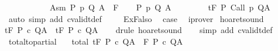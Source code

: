 \begin{isabellebody}
\ \ \ \ \isamarkupfalse%
\isanewline
\ \ \isamarkupfalse%
\isanewline
{}\isamarkupfalse%
\isanewline
\ \ \isamarkupfalse%
\ {\isacharparenleft}Asm\ P\ p\ Q\ A\ {\isasymTheta}\ F{\isacharparenright}\isanewline
\ \ \isamarkupfalse%
\ {\isachardoublequoteopen}{\isacharparenleft}P{\isacharcomma}\ p{\isacharcomma}\ Q{\isacharcomma}\ A{\isacharparenright}\ {\isasymin}\ {\isasymTheta}{\isachardoublequoteclose}\isanewline
\ \ \isamarkupfalse%
\ \isamarkupfalse%
\ {\isachardoublequoteopen}{\isasymGamma}{\isacharcomma}{\isasymTheta}\ {\isasymTurnstile}\isactrlsub t\isactrlbsub {\isacharslash}F\isactrlesub \ P\ {\isacharparenleft}Call\ p{\isacharparenright}\ Q{\isacharcomma}A{\isachardoublequoteclose}\isanewline
\ \ \ \ \isamarkupfalse%
\ {\isacharparenleft}auto\ simp\ add{\isacharcolon}\ cvalidt{\isacharunderscore}def\ {\isacharparenright}\isanewline
{}\isamarkupfalse%
\isanewline
\ \ \isamarkupfalse%
\ ExFalso\ \isamarkupfalse%
\ {\isacharquery}case\ \isamarkupfalse%
\ iprover\isanewline
{}\isamarkupfalse%
%
\endisatagproof
{\isafoldproof}%
%
\isadelimproof
\isanewline
%
\endisadelimproof
\isanewline
{}\isamarkupfalse%
\ hoaret{\isacharunderscore}sound{\isacharprime}{\isacharcolon}\isanewline
{\isachardoublequoteopen}{\isasymGamma}{\isacharcomma}{\isacharbraceleft}{\isacharbraceright}{\isasymturnstile}\isactrlsub t\isactrlbsub {\isacharslash}F\isactrlesub \ P\ c\ Q{\isacharcomma}A\ {\isasymLongrightarrow}\ {\isasymGamma}{\isasymTurnstile}\isactrlsub t\isactrlbsub {\isacharslash}F\isactrlesub \ P\ c\ Q{\isacharcomma}A{\isachardoublequoteclose}\isanewline
%
\isadelimproof
\ \ %
\endisadelimproof
%
\isatagproof
{}\isamarkupfalse%
\ {\isacharparenleft}drule\ hoaret{\isacharunderscore}sound{\isacharparenright}\isanewline
\ \ \isamarkupfalse%
\ {\isacharparenleft}simp\ add{\isacharcolon}\ cvalidt{\isacharunderscore}def{\isacharparenright}\isanewline
\ \ \isamarkupfalse%
%
\endisatagproof
{\isafoldproof}%
%
\isadelimproof
\isanewline
%
\endisadelimproof
\isanewline
{}\isamarkupfalse%
\ total{\isacharunderscore}to{\isacharunderscore}partial{\isacharcolon}\ \isanewline
\ \ total{\isacharcolon}\ {\isachardoublequoteopen}{\isasymGamma}{\isacharcomma}{\isacharbraceleft}{\isacharbraceright}{\isasymturnstile}\isactrlsub t\isactrlbsub {\isacharslash}F\isactrlesub \ P\ c\ Q{\isacharcomma}A{\isachardoublequoteclose}\ \ {\isachardoublequoteopen}{\isasymGamma}{\isacharcomma}{\isacharbraceleft}{\isacharbraceright}{\isasymturnstile}\isactrlbsub {\isacharslash}F\isactrlesub \ P\ c\ Q{\isacharcomma}A{\isachardoublequoteclose}\isanewline

\end{isabellebody}
